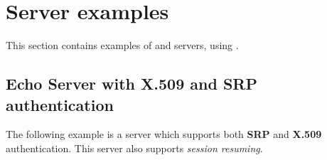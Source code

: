 

\section{Server examples}
This section contains examples of \tls{} and \ssl{} servers, using \gnutls{}.

\subsection{Echo Server with X.509 and SRP authentication}
The following example is a server which supports both {\bf SRP} and {\bf X.509} authentication.
This server also supports {\it session resuming}.



